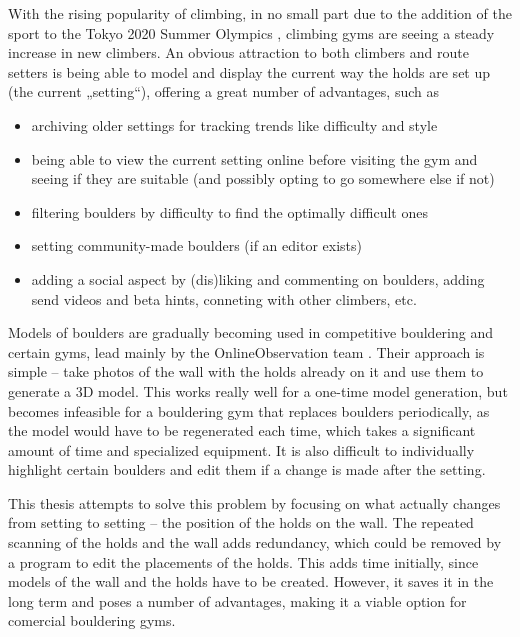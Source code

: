 

With the rising popularity of climbing, in no small part due to the addition of the sport to the Tokyo 2020 Summer Olympics \cite{olympics}, climbing gyms are seeing a steady increase in new climbers.
An obvious attraction to both climbers and route setters is being able to model and display the current way the holds are set up (the current „setting“), offering a great number of advantages, such as

\begin{itemize}
	\item archiving older settings for tracking trends like difficulty and style
	\item being able to view the current setting online before visiting the gym and seeing if they are suitable (and possibly opting to go somewhere else if not)
	\item filtering boulders by difficulty to find the optimally difficult ones
	\item setting community-made boulders (if an editor exists)
	\item adding a social aspect by (dis)liking and commenting on boulders, adding send videos and beta hints, conneting with other climbers, etc.
\end{itemize}

Models of boulders are gradually becoming used in competitive bouldering and certain gyms, lead mainly by the OnlineObservation team \cite{onlineobservation}.
Their approach is simple -- take photos of the wall with the holds already on it and use them to generate a 3D model.
This works really well for a one-time model generation, but becomes infeasible for a bouldering gym that replaces boulders periodically, as the model would have to be regenerated each time, which takes a significant amount of time and specialized equipment.
It is also difficult to individually highlight certain boulders and edit them if a change is made after the setting.

This thesis attempts to solve this problem by focusing on what actually changes from setting to setting -- the position of the holds on the wall.
The repeated scanning of the holds and the wall adds redundancy, which could be removed by a program to edit the placements of the holds.
This adds time initially, since models of the wall and the holds have to be created.
However, it saves it in the long term and poses a number of advantages, making it a viable option for comercial bouldering gyms.



